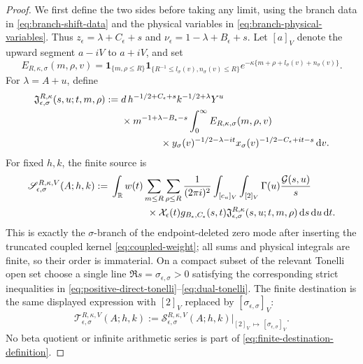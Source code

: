 \begin{proof}
We first define the two sides before taking any limit, using the branch data
in \eqref{eq:branch-shift-data} and the physical variables in
\eqref{eq:branch-physical-variables}.  Thus
$z_\epsilon=\lambda+C_\epsilon+s$ and
$\nu_\epsilon=1-\lambda+B_\epsilon+s$.
Let $[a]_V$ denote the upward segment $a-iV$ to $a+iV$, and set
\begin{equation}\label{eq:finite-physical-regulator}
 E_{R,\kappa,\sigma}(m,\rho,v)
 =\mathbf 1_{\{m,\rho\leq R\}}
  \mathbf 1_{\{R^{-1}\leq l_\sigma(v),n_\sigma(v)\leq R\}}
  e^{-\kappa\{m+\rho+l_\sigma(v)+n_\sigma(v)\}}.
\end{equation}
For $\lambda=A+u$, define
\begin{align}
 \mathfrak J_{\epsilon,\sigma}^{R,\kappa}
 (s,u;t,m,\rho)
 :={}&d\,h^{-1/2+C_\epsilon+s}k^{-1/2+\lambda}
 Y^u\notag\\
 &\times m^{-1+\lambda-B_\epsilon-s}
 \int_0^\infty E_{R,\kappa,\sigma}(m,\rho,v)\notag\\
 &\hspace{14mm}\times
 y_\sigma(v)^{-1/2-\lambda-it}
 x_\sigma(v)^{-1/2-C_\epsilon+it-s}\dd v.
 \label{eq:finite-branch-physical-integral}
\end{align}
For fixed $h,k$, the finite source is
\begin{align}
 \mathscr S_{\epsilon,\sigma}^{R,\kappa,V}(A;h,k)
 :={}&\int_{\R}w(t)\sum_{m\leq R}\sum_{\rho\leq R}
 \frac1{(2\pi i)^2}\int_{[c_u]_V}\int_{[2]_V}
 \Gamma(u)\frac{\mathcal G(s,u)}s\notag\\
 &\hspace{13mm}\times\mathcal X_\epsilon(t)
 g_{B_\epsilon,C_\epsilon}(s,t)
 \mathfrak J_{\epsilon,\sigma}^{R,\kappa}
 (s,u;t,m,\rho)\dd s\dd u\dd t.
 \label{eq:finite-source-definition}
\end{align}
This is exactly the $\sigma$-branch of the endpoint-deleted zero mode after
inserting the truncated coupled kernel \eqref{eq:coupled-weight}; all sums and
physical integrals are finite, so their order is immaterial.  On a compact
subset of the relevant Tonelli open set choose a single line
$\Re s=\sigma_{\epsilon,\sigma}>0$ satisfying the corresponding strict
inequalities in
\eqref{eq:positive-direct-tonelli}--\eqref{eq:dual-tonelli}.  The finite
destination is the same displayed expression with $[2]_V$ replaced by
$[\sigma_{\epsilon,\sigma}]_V$:
\begin{equation}\label{eq:finite-destination-definition}
 \mathscr T_{\epsilon,\sigma}^{R,\kappa,V}(A;h,k)
 :=\mathscr S_{\epsilon,\sigma}^{R,\kappa,V}(A;h,k)
 \big|_{[2]_V\,\mapsto\,[\sigma_{\epsilon,\sigma}]_V}.
\end{equation}
No beta quotient or infinite arithmetic series is part of
\eqref{eq:finite-destination-definition}.


\end{proof}
